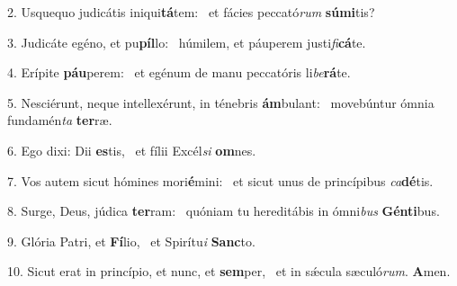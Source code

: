 2. Usquequo judicátis iniqui\textbf{tá}tem: \ast\  et fácies peccató\textit{rum} \textbf{sú}\textbf{mi}tis?\

3. Judicáte egéno, et pu\textbf{píl}lo: \ast\  húmilem, et páuperem justi\textit{fi}\textbf{cá}te.\

4. Erípite \textbf{páu}perem: \ast\  et egénum de manu peccatóris li\textit{be}\textbf{rá}te.\

5. Nesciérunt, neque intellexérunt, in ténebris \textbf{ám}bulant: \ast\  movebúntur ómnia fundamén\textit{ta} \textbf{ter}ræ.\

6. Ego dixi: Dii \textbf{es}tis, \ast\  et fílii Excél\textit{si} \textbf{om}nes.\

7. Vos autem sicut hómines mori\textbf{é}mini: \ast\  et sicut unus de princípibus \textit{ca}\textbf{dé}tis.\

8. Surge, Deus, júdica \textbf{ter}ram: \ast\  quóniam tu hereditábis in ómni\textit{bus} \textbf{Gén}\textbf{ti}bus.\

9. Glória Patri, et \textbf{Fí}lio, \ast\  et Spirítu\textit{i} \textbf{Sanc}to.\

10. Sicut erat in princípio, et nunc, et \textbf{sem}per, \ast\  et in sǽcula sæculó\textit{rum}. \textbf{A}men.\

